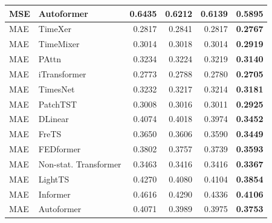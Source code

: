 \begin{longtable}{llrrrr}
MSE & Autoformer & 0.6435 & 0.6212 & 0.6139 & \textbf{0.5895} \\
\midrule
MAE & TimeXer & 0.2817 & 0.2841 & 0.2817 & \textbf{0.2767} \\
MAE & TimeMixer & 0.3014 & 0.3018 & 0.3014 & \textbf{0.2919} \\
MAE & PAttn & 0.3234 & 0.3224 & 0.3219 & \textbf{0.3140} \\
MAE & iTransformer & 0.2773 & 0.2788 & 0.2780 & \textbf{0.2705} \\
MAE & TimesNet & 0.3232 & 0.3217 & 0.3214 & \textbf{0.3181} \\
MAE & PatchTST & 0.3008 & 0.3016 & 0.3011 & \textbf{0.2925} \\
MAE & DLinear & 0.4074 & 0.4018 & 0.3974 & \textbf{0.3452} \\
MAE & FreTS & 0.3650 & 0.3606 & 0.3590 & \textbf{0.3449} \\
MAE & FEDformer & 0.3802 & 0.3757 & 0.3739 & \textbf{0.3593} \\
MAE & Non-stat. Transformer & 0.3463 & 0.3416 & 0.3416 & \textbf{0.3367} \\
MAE & LightTS & 0.4270 & 0.4080 & 0.4104 & \textbf{0.3854} \\
MAE & Informer & 0.4616 & 0.4290 & 0.4336 & \textbf{0.4106} \\
MAE & Autoformer & 0.4071 & 0.3989 & 0.3975 & \textbf{0.3753} \\
\end{longtable}
\endgroup

